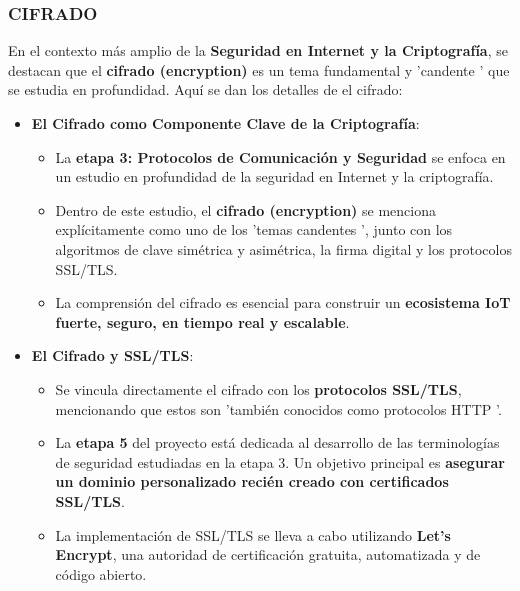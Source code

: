 \documentclass{report}
\begin{document}
\subsubsection{CIFRADO}
En el contexto más amplio de la \textbf{Seguridad en Internet y la Criptografía}, se  destacan que el \textbf{cifrado (encryption)} es un tema 
fundamental y  'candente ' que se estudia en profundidad. Aquí se dan los detalles de el cifrado:

\begin{itemize}
    \item \textbf{El Cifrado como Componente Clave de la Criptografía}:
    \begin{itemize}
        \item La \textbf{etapa 3: Protocolos de Comunicación y Seguridad} se enfoca en un estudio en profundidad de la seguridad en Internet y la 
        criptografía.
        \item Dentro de este estudio, el \textbf{cifrado (encryption)} se menciona explícitamente como uno de los  'temas candentes ', junto con los 
        algoritmos de clave simétrica y asimétrica, la firma digital y los protocolos SSL/TLS.
        \item La comprensión del cifrado es esencial para construir un \textbf{ecosistema IoT fuerte, seguro, en tiempo real y escalable}.
    \end{itemize}

    \item \textbf{El Cifrado y SSL/TLS}:
    \begin{itemize}
        \item Se vincula directamente el cifrado con los \textbf{protocolos SSL/TLS}, mencionando que estos son  'también conocidos como 
        protocolos HTTP '.
        \item La \textbf{etapa 5} del proyecto está dedicada al desarrollo de las terminologías de seguridad estudiadas en la etapa 3. Un 
        objetivo principal es \textbf{asegurar un dominio personalizado recién creado con certificados SSL/TLS}.
        \item La implementación de SSL/TLS se lleva a cabo utilizando \textbf{Let's Encrypt}, una autoridad de certificación gratuita, automatizada y 
        de código abierto.
    \end{itemize}


\end{itemize}
\end{document}
